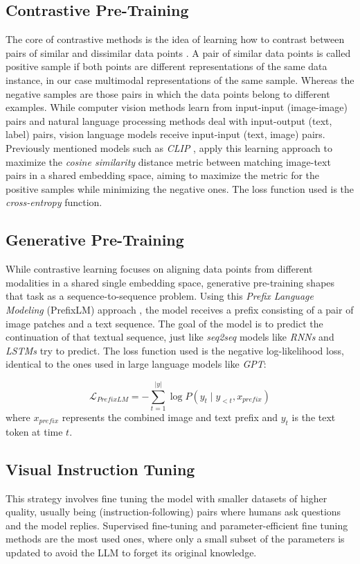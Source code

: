 \subsection{Contrastive Pre-Training}
The core of contrastive methods is the idea  of learning how to contrast between pairs of similar and dissimilar data points \cite{rethmeier2021primercontrastivepretraininglanguage}. A pair of similar data points is called positive sample if both points are different representations of the same data instance, in our case multimodal representations of the same sample. Whereas the negative samples are those pairs in which the data points belong to different examples. While computer vision methods learn from input-input (image-image) pairs and natural language processing methods deal with input-output (text, label) pairs, vision language models receive input-input (text, image) pairs. Previously mentioned models such as \textit{CLIP} \cite{radford2021learningtransferablevisualmodels}, apply this learning approach to maximize the \textit{cosine similarity} distance metric between matching image-text pairs in a shared embedding space, aiming to maximize the metric for the positive samples while minimizing the negative ones. The loss function used is the \textit{cross-entropy} function.

\subsection{Generative Pre-Training}
While contrastive learning focuses on aligning data points from different modalities in a shared single embedding space, generative pre-training shapes that task as a sequence-to-sequence problem. Using this \textit{Prefix Language Modeling} (PrefixLM) approach \cite{wang2022simvlmsimplevisuallanguage}, the model receives a prefix consisting of a pair of image patches and a text sequence. The goal of the model is to predict the continuation of that textual sequence, just like \textit{seq2seq} models like \textit{RNNs} and \textit{LSTMs} try to predict. The loss function used is the negative log-likelihood loss, identical to the ones used in large language models like \textit{GPT}:

$$\mathcal{L}_{PrefixLM} = -\sum_{t=1}^{|y|} \log P(y_t \mid y_{<t}, x_{prefix})$$
where $x_{prefix}$ represents the combined image and text prefix and $y_{t}$ is the text token at time $t$.

\subsection{Visual Instruction Tuning}
This strategy involves fine tuning the model with smaller datasets of higher quality, usually being (instruction-following) pairs where humans ask questions and the model replies. Supervised fine-tuning and parameter-efficient fine tuning methods are the most used ones, where only a small subset of the parameters is updated to avoid the LLM to forget its original knowledge. 

